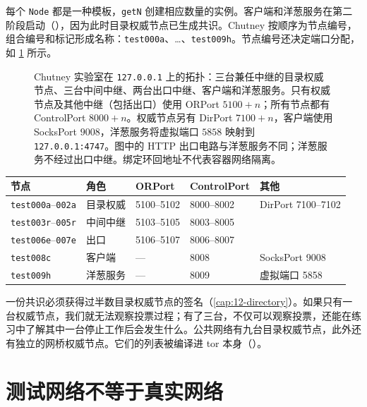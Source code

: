 每个 \texttt{Node} 都是一种模板，\texttt{getN} 创建相应数量的实例。客户端和洋葱服务在第二阶段启动（），因为此时目录权威节点已生成共识。Chutney 按顺序为节点编号，组合编号和标记形成名称：\texttt{test000a}、\ldots、\texttt{test009h}。节点编号还决定端口分配，如 \cref{fig:rete-privata} 所示。

\begin{figure}[htbp]
\centering

\caption{Chutney 实验室在 \texttt{127.0.0.1} 上的拓扑：三台兼任中继的目录权威节点、三台中间中继、两台出口中继、客户端和洋葱服务。只有权威节点及其他中继（包括出口）使用 ORPort $5100+n$；所有节点都有 ControlPort $8000+n$。权威节点另有 DirPort $7100+n$，客户端使用 SocksPort $9008$，洋葱服务将虚拟端口 $5858$ 映射到 \texttt{127.0.0.1:4747}。图中的 HTTP 出口电路与洋葱服务不同；洋葱服务不经过出口中继。绑定环回地址不代表容器网络隔离。}
\label{fig:rete-privata}
\end{figure}

\begin{center}\small
\begin{tabular}{lllll}
\toprule
节点 & 角色 & ORPort & ControlPort & 其他 \\
\midrule
\texttt{test000a}--\texttt{002a} & 目录权威 & 5100--5102 & 8000--8002 & DirPort 7100--7102 \\
\texttt{test003r}--\texttt{005r} & 中间中继 & 5103--5105 & 8003--8005 & \\
\texttt{test006e}--\texttt{007e} & 出口 & 5106--5107 & 8006--8007 & \\
\texttt{test008c} & 客户端 & --- & 8008 & SocksPort 9008 \\
\texttt{test009h} & 洋葱服务 & --- & 8009 & 虚拟端口 5858 \\
\bottomrule
\end{tabular}
\end{center}

\begin{approfondimento}[为什么需要三台目录权威节点？]
一份共识必须获得过半数目录权威节点的签名（\cref{cap:12-directory}）。如果只有一台权威节点，我们就无法观察投票过程；有了三台，不仅可以观察投票，还能在练习中了解其中一台停止工作后会发生什么。公共网络有九台目录权威节点，此外还有独立的网桥权威节点。它们的列表被编译进 tor 本身（）。
\end{approfondimento}

\section{测试网络不等于真实网络}\label{sec:rp-opzioni}


